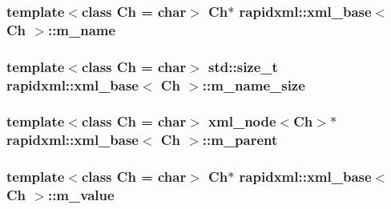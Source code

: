 \subsubsection[{m\+\_\+name}]{\setlength{\rightskip}{0pt plus 5cm}template$<$class Ch  = char$>$ Ch$\ast$ {\bf rapidxml\+::xml\+\_\+base}$<$ Ch $>$\+::m\+\_\+name\hspace{0.3cm}{\ttfamily [protected]}}\label{classrapidxml_1_1xml__base_afd9851ed43e14619db0d7075ef8e9e8a}
\hypertarget{classrapidxml_1_1xml__base_a5a8c76a7274b4180213796422c4df76f}{}
\subsubsection[{m\+\_\+name\+\_\+size}]{\setlength{\rightskip}{0pt plus 5cm}template$<$class Ch  = char$>$ std\+::size\+\_\+t {\bf rapidxml\+::xml\+\_\+base}$<$ Ch $>$\+::m\+\_\+name\+\_\+size\hspace{0.3cm}{\ttfamily [protected]}}\label{classrapidxml_1_1xml__base_a5a8c76a7274b4180213796422c4df76f}
\hypertarget{classrapidxml_1_1xml__base_a90d5f660f078f66563fd7b2d8387ccb0}{}
\subsubsection[{m\+\_\+parent}]{\setlength{\rightskip}{0pt plus 5cm}template$<$class Ch  = char$>$ {\bf xml\+\_\+node}$<$Ch$>$$\ast$ {\bf rapidxml\+::xml\+\_\+base}$<$ Ch $>$\+::m\+\_\+parent\hspace{0.3cm}{\ttfamily [protected]}}\label{classrapidxml_1_1xml__base_a90d5f660f078f66563fd7b2d8387ccb0}
\hypertarget{classrapidxml_1_1xml__base_a278a1ea63b0b70219b946cec47fa00ea}{}
\subsubsection[{m\+\_\+value}]{\setlength{\rightskip}{0pt plus 5cm}template$<$class Ch  = char$>$ Ch$\ast$ {\bf rapidxml\+::xml\+\_\+base}$<$ Ch $>$\+::m\+\_\+value\hspace{0.3cm}{\ttfamily [protected]}}\label{classrapidxml_1_1xml__base_a278a1ea63b0b70219b946cec47fa00ea}
\hypertarget{classrapidxml_1_1xml__base_aa3a49d8ceddb8a8d7edb773a2226b89c}{}
